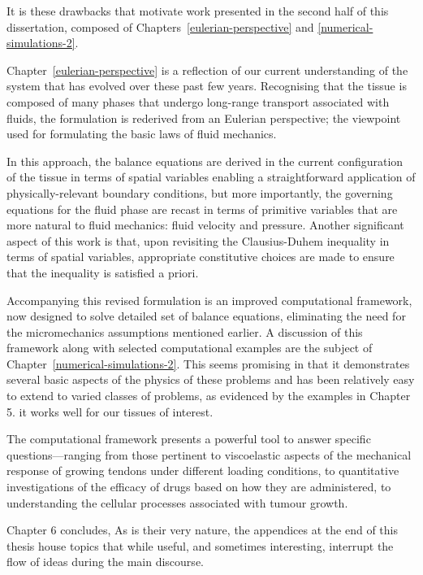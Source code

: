 It is these drawbacks that motivate work presented in the second half
of this dissertation, composed of Chapters~\ref{eulerian-perspective} and
\ref{numerical-simulations-2}.


Chapter~\ref{eulerian-perspective} is a reflection of our current
understanding of the system that has evolved over these past few
years. Recognising that the tissue is composed of many phases that
undergo long-range transport associated with fluids, the formulation
is rederived from an Eulerian perspective; the viewpoint used for
formulating the basic laws of fluid mechanics.

In this approach, the balance equations are derived in the current
configuration of the tissue in terms of spatial variables  enabling a
straightforward application of 
physically-relevant boundary conditions, but more importantly, the
governing equations for the fluid phase are recast in terms of
primitive variables that are more natural to fluid mechanics: fluid
velocity and pressure. Another significant aspect of this work is
that, upon revisiting the Clausius-Duhem inequality in terms of
spatial variables, appropriate constitutive choices are made to ensure
that the inequality is satisfied a priori.

Accompanying this revised formulation is an improved computational
framework, now designed to solve detailed set of balance equations,
eliminating the need for the micromechanics assumptions
mentioned earlier. A discussion of this framework along with selected
computational examples are the subject of
Chapter~\ref{numerical-simulations-2}. This seems promising in that
it demonstrates several basic aspects of the physics of these problems
and has been relatively easy to extend to varied classes of problems,
as evidenced by the examples in Chapter 5. it works well for our
tissues of interest.

The computational framework presents a powerful tool to answer
specific questions—ranging from those pertinent to viscoelastic
aspects of the mechanical response of growing tendons under different
loading conditions, to quantitative investigations of the efficacy of
drugs based on how they are administered, to understanding the
cellular processes associated with tumour growth.

Chapter 6 concludes, As is their very nature, the appendices at the end of this thesis
house topics that while useful, and sometimes interesting, interrupt
the flow of ideas during the main
discourse.

